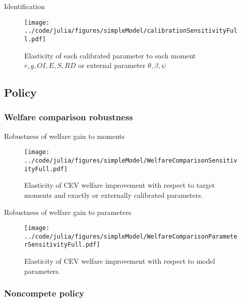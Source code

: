 \documentclass[english,usenames,dvipsnames]{beamer}
\begin{document}
\begin{frame}{Identification}\label{identification}\hyperlink{parameters}{} 
	\begin{figure}
		\texttt{[image: ../code/julia/figures/simpleModel/calibrationSensitivityFull.pdf]}
		\caption{\small Elasticity of each calibrated parameter to each moment $r,g,OI,E,S,RD$ or external parameter $\theta, \beta, \psi$}
	\end{figure}
\end{frame}


\subsection{Policy}

\subsubsection{Welfare comparison robustness}

\begin{frame}{Robustness of welfare gain to moments}\label{robustness_to_moments}
\hyperlink{reducing_kappa_c_table}{}
	\begin{figure}
		\texttt{[image: ../code/julia/figures/simpleModel/WelfareComparisonSensitivityFull.pdf]}
		\caption{Elasticity of CEV welfare improvement with respect to target moments and exactly or externally calibrated parameters.}
		\label{WelfareComparisonSensitivityFull}
	\end{figure}
\end{frame}

\begin{frame}{Robustness of welfare gain to parameters}\label{robustness_to_parameters}
	\hyperlink{reducing_kappa_c_table}{}
	\begin{figure}
		\texttt{[image: ../code/julia/figures/simpleModel/WelfareComparisonParameterSensitivityFull.pdf]}
		\caption{Elasticity of CEV welfare improvement with respect to model parameters.}
		\label{WelfareComparisonSensitivityFull}
	\end{figure}
\end{frame}


\subsubsection{Noncompete policy}
\end{document}
